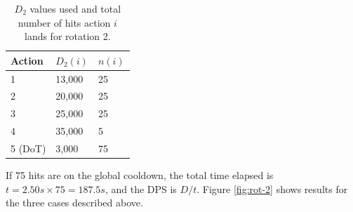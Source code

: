 \documentclass{article}
\begin{document}
        \begin{table}[H]
            \centering
            \caption{$D_2$ values used and total number of hits action $i$ lands for rotation 2.}\label{t:rot2}
            \begin{tabular}{@{}lll@{}}
            \toprule
            \multicolumn{1}{l}{Action} & \multicolumn{1}{l}{$D_2(i)$} & \multicolumn{1}{l}{$n(i)$} \\ \midrule
            1                          & 13,000                    & 25                       \\
            2                          & 20,000                    & 25                       \\
            3                          & 25,000                    & 25                       \\
            4                          & 35,000                    & 5                        \\
            5 (DoT)                    &  3,000                    & 75                       \\ \bottomrule
            \end{tabular}
        \end{table}

        If 75 hits are on the global cooldown, the total time elapsed is $t = 2.50 s \times 75 =187.5s$, and the DPS is $D / t$. Figure \ref{fig:rot-2} shows results for the three cases described above.
\end{document}
